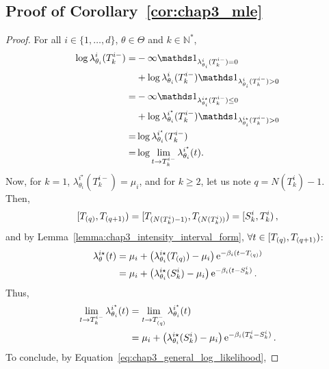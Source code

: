\begin{subappendices}
  \section{Proof of Corollary~\ref{cor:chap3_mle}} \label{app:chap3_proof_cor_mle}
      \begin{proof}
            For all \(i \in \{1, \dots, d\}\), \(\theta \in \Theta\) and \(k \in \mathbb N^*\),
            \begin{align*}
              \log{\lambda^i_{\theta_i}(T_k^{i-})}
              = &- \infty \II_{\lambda^i_{\theta_i}(T_k^{i-}) = 0} \\
              &+ \log{\lambda^i_{\theta_i}(T_k^{i-})} \II_{\lambda^i_{\theta_i}(T_k^{i-}) > 0} \\
              = &- \infty \II_{\lambda^{i\star}_{\theta_i}(T_k^{i-}) \le 0} \\
              &+ \log{\lambda^{i^\star}_{\theta_i}(T_k^{i-})} \II_{\lambda^{i\star}_{\theta_i}(T_k^{i-}) > 0} \\
              = &\log{\lambda^{i^\star}_{\theta_i}(T_k^{i-})} \\
              = &\log{\lim_{t \to T_k^{i-}} \lambda^{i^\star}_{\theta_i}(t)}.
            \end{align*}
            Now, for \(k=1\), \(\lambda^{i^\star}_{\theta_i}(T_k^{i-}) = \mu_i\),
            and for \(k \geq 2\), let us note \(q = N(T_k^i)-1\).
            Then,
            \[
              [T\park[q], T\park[q+1]) = [T\park[N(T_k^i)-1], T\park[N(T_k^i)]) = [S_k^i, T_k^i) \,,
            \]
            and by Lemma~\ref{lemma:chap3_intensity_interval_form}, \(\forall t \in [T\park[q], T\park[q+1])\):
            \begin{align*}
              \lambda_\theta^{i\star}(t)
              &= \mu_i + \left(\lambda_{\theta_i}^{i\star}(T\park[q]) - \mu_i\right)\mathrm{e}^{-\beta_i(t-T\park[q])}\\
              &= \mu_i + \left(\lambda_{\theta_i}^{i\star}(S_k^i) - \mu_i\right)\mathrm{e}^{-\beta_i(t-S_k^i)}\,.
            \end{align*}
            Thus, 
            \begin{align*}
              \lim_{t \to T_k^{i-}} \lambda^{i^\star}_{\theta_i}(t)
              &= \lim_{t \to T\park[q]^{-}} \lambda^{i^\star}_{\theta_i}(t)\\
              &= \mu_i + \left(\lambda_{\theta_i}^{i\star}(S_k^i) - \mu_i\right)\mathrm{e}^{-\beta_i(T_k^{i}-S_k^i)}\,.
            \end{align*}
            To conclude, by Equation~\eqref{eq:chap3_general_log_likelihood},

\end{proof}
\end{subappendices}
